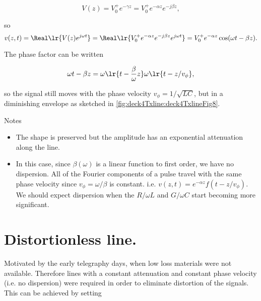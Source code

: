 \begin{dmath}\label{eqn:uwaves4TransmissionLines:700}
V(z) 
= V_0^{+} e^{-\gamma z} 
= V_0^{+} e^{-\alpha z} e^{-j \beta z},
\end{dmath}

so 
\begin{dmath}\label{eqn:uwaves4TransmissionLines:720}
v(z, t) 
= \Real \lr{ V(z) e^{j \omega t} }
= \Real \lr{ V_0^{+} e^{-\alpha z} e^{-j \beta z} e^{j \omega t} }
= V_0^{+} e^{-\alpha z} \cos( \omega t - \beta z ).
\end{dmath}

The phase factor can be written

\begin{dmath}\label{eqn:uwaves4TransmissionLines:740}
\omega t - \beta z 
= 
\omega \lr{ t - \frac{\beta}{\omega} z }
\omega \lr{ t - z/v_\phi },
\end{dmath}

so the signal still moves with the phase velocity \( v_\phi = 1/\sqrt{LC} \), but in a diminishing envelope as sketched in \cref{fig:deck4Txline:deck4TxlineFig8}.


Notes

\begin{itemize}
\item The shape is preserved but the amplitude has an exponential attenuation along the line.
\item In this case, since \( \beta(\omega) \) is a linear function to first order, we have no dispersion.  All of the Fourier components of a pulse travel with the same phase velocity since \( v_\phi = \omega/\beta \) is constant.  i.e.  \( v(z, t) = e^{-\alpha z} f( t - z/v_\phi ) \).  We should expect dispersion when the \( R/\omega L \) and \( G/\omega C \) start becoming more significant.
\end{itemize}

\section{Distortionless line.}

Motivated by the early telegraphy days, when low loss materials were not available.  Therefore lines with a constant attenuation and constant phase velocity (i.e. no dispersion) were required in order to eliminate distortion of the signals.  This can be achieved by setting 

